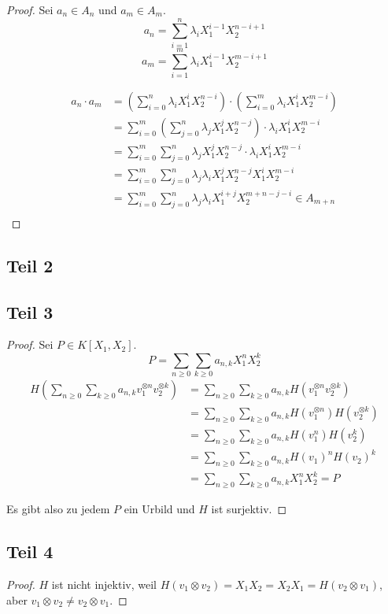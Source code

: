 \documentclass[10pt,a4paper]{article}
\begin{document}
\begin{proof}
Sei $a_{n} \in A_{n}$ und $a_{m} \in A_{m}$.
\begin{equation}
a_{n} = \sum_{i = 1}^{n} \lambda_{i} X_{1}^{i - 1}X_{2}^{n - i + 1}
\end{equation}
\begin{equation}
a_{m} = \sum_{i = 1}^{m} \lambda_{i} X_{1}^{i - 1}X_{2}^{m - i + 1}
\end{equation}

\begin{align*}
a_{n} \cdot a_{m} & = \left( \sum_{i = 0}^{n} \lambda_{i} X_{1}^{i}X_{2}^{n - i} \right) \cdot \left( \sum_{i = 0}^{m} \lambda_{i} X_{1}^{i}X_{2}^{m - i} \right)\\
& = \sum_{i = 0}^{m} \left( \sum_{j = 0}^{n} \lambda_{j} X_{1}^{j}X_{2}^{n - j} \right) \cdot \lambda_{i} X_{1}^{i}X_{2}^{m - i}\\
& = \sum_{i = 0}^{m} \sum_{j = 0}^{n} \lambda_{j} X_{1}^{j}X_{2}^{n - j} \cdot \lambda_{i} X_{1}^{i}X_{2}^{m - i}\\
& = \sum_{i = 0}^{m} \sum_{j = 0}^{n} \lambda_{j}\lambda_{i} X_{1}^{j}X_{2}^{n - j}X_{1}^{i}X_{2}^{m - i}\\
& = \sum_{i = 0}^{m} \sum_{j = 0}^{n} \lambda_{j}\lambda_{i} X_{1}^{i + j}X_{2}^{m + n - j - i} \in A_{m + n}\\
\end{align*}
\end{proof}

\subsection*{Teil 2}

\subsection*{Teil 3}

\begin{proof}
Sei $P \in K[X_{1}, X_{2}]$.
\begin{equation}
P = \sum_{n \ge 0} \sum_{k \ge 0} a_{n, k} X_{1}^{n}X_{2}^{k}
\end{equation}
\begin{align*}
H(\sum_{n \ge 0} \sum_{k \ge 0} a_{n, k} v_{1}^{\otimes n} v_{2}^{\otimes k}) & = \sum_{n \ge 0} \sum_{k \ge 0} a_{n, k} H(v_{1}^{\otimes n} v_{2}^{\otimes k})\\
& = \sum_{n \ge 0} \sum_{k \ge 0} a_{n, k} H(v_{1}^{\otimes n})H(v_{2}^{\otimes k})\\
& = \sum_{n \ge 0} \sum_{k \ge 0} a_{n, k} H(v_{1}^{n})H(v_{2}^{k})\\
& = \sum_{n \ge 0} \sum_{k \ge 0} a_{n, k} H(v_{1})^{n}H(v_{2})^{k}\\
& = \sum_{n \ge 0} \sum_{k \ge 0} a_{n, k} X_{1}^{n}X_{2}^{k} = P
\end{align*}

Es gibt also zu jedem $P$ ein Urbild und $H$ ist surjektiv.
\end{proof}

\subsection*{Teil 4}

\begin{proof}
$H$ ist nicht injektiv, weil $H(v_{1} \otimes v_{2}) = X_{1}X_{2} = X_{2}X_{1} = H(v_{2} \otimes v_{1})$, aber $v_{1} \otimes v_{2} \ne v_{2} \otimes v_{1}$.
\end{proof}
\end{document}
